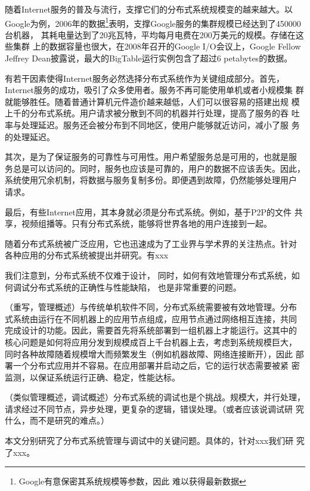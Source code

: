 随着Internet服务的普及与流行，支撑它们的分布式系统规模变的越来越大。以
Google为例，2006年的数据\footnote{Google有意保密其系统规模等参数，因此
难以获得最新数据}表明，支撑Google服务的集群规模已经达到了450000台机器，
其耗电量达到了20兆瓦特，平均每月电费在200万美元的规模。存储在这些集群
上的数据容量也很大，在2008年召开的Google I/O会议上，Google Fellow
Jeffrey Dean披露说，最大的BigTable运行实例包含了超过6 petabytes的数据。


有若干因素使得Internet服务必然选择分布式系统作为关键组成部分。首先，
Internet服务的成功，吸引了众多使用者。服务不再可能使用单机或者小规模集
群就能够胜任。随着普通计算机元件造价越来越低，人们可以很容易的搭建出规
模上千的分布式系统。用户请求被分散到不同的机器并行处理，提高了服务的吞
吐率与处理延迟。服务还会被分布到不同地区，使用户能够就近访问，减小了服
务的处理延迟。

其次，是为了保证服务的可靠性与可用性。用户希望服务总是可用的，也就是服
务总是可以访问的。同时，服务也应该是可靠的，用户的数据不应该丢失。因此，
系统使用冗余机制，将数据与服务复制多份。即便遇到故障，仍然能够处理用户
请求。

最后，有些Internet应用，其本身就必须是分布式系统。例如，基于P2P的文件
共享，视频组播等。只有分布式系统，能够将世界各地的用户连接到一起。


随着分布式系统被广泛应用，它也迅速成为了工业界与学术界的关注热点。针对
各种应用的分布式系统被提出并研究。有xxx

我们注意到，分布式系统不仅难于设计，
同时，如何有效地管理分布式系统，如何调试分布式系统的正确性与性能缺陷，
也是非常重要的问题。

（重写，管理概述）与传统单机软件不同，分布式系统需要被有效地管理。分布
式系统由运行在不同机器上的应用节点组成，应用节点通过网络相互连接，共同
完成设计的功能。因此，需要首先将系统部署到一组机器上才能运行。这其中的
核心问题是如何将应用分发到规模成百上千台机器上去，考虑到系统规模巨大，
同时各种故障随着规模增大而频繁发生（例如机器故障、网络连接断开），因此
部署一个分布式应用并不容易。在应用部署并启动之后，它的运行状态需要被紧
密监测，以保证系统运行正确、稳定，性能达标。

（类似管理概述，调试概述）分布式系统的调试也是个挑战。规模大，并行处理，
请求经过不同节点，异步处理，更复杂的逻辑，错误处理。（或者应该说调试研
究什么，而不是研究的难点。）


本文分别研究了分布式系统管理与调试中的关键问题。具体的，针对xxx我们研
究了xxx。

